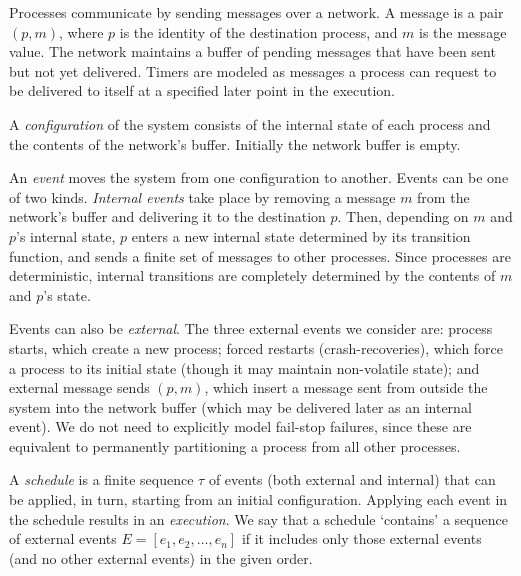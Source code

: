 Processes communicate by sending messages over a network. A message is a pair
$\left(p, m\right)$, where $p$ is the identity of the destination process, and $m$ is the
message value. The network maintains a buffer of pending messages that have
been sent but not yet delivered. Timers are modeled as messages a process can request to be delivered
to itself at a specified later point in the execution.


A {\em configuration} of the system consists of the internal state of each process and
the contents of the network's buffer. Initially the network buffer is empty.

An {\em event} moves the system from one configuration to another. Events can
be one of two kinds. {\em Internal events} take place by
removing a message $m$
from the network's buffer and delivering it to the destination $p$. Then,
depending on $m$ and $p$'s internal state, $p$ enters a new internal state
determined by its transition function, and
sends a finite set of messages to other processes. Since processes are
deterministic, internal transitions are completely determined by the contents
of $m$ and $p$'s
state.

Events can also be {\em external}.
The three external events we consider are:
process starts, which create a new process; forced restarts (crash-recoveries), which force a process to its initial
state (though it may maintain non-volatile state); and external
message sends $\left(p, m\right)$, which insert a message sent from outside the system
into the network buffer (which may be delivered later as an internal event).
We do not need to explicitly model fail-stop failures, since these are
equivalent to permanently partitioning a process from all other processes.


A {\em schedule} is a finite sequence $\tau$ of events (both external and
internal) that can be applied, in
turn, starting from an initial configuration. Applying each event in the
schedule results in an {\em execution}. We say that a schedule `contains' a sequence of external
events $E = [ e_1, e_2, \ldots, e_n  ]$ if it includes only those external
events (and no other external events) in the given order.

